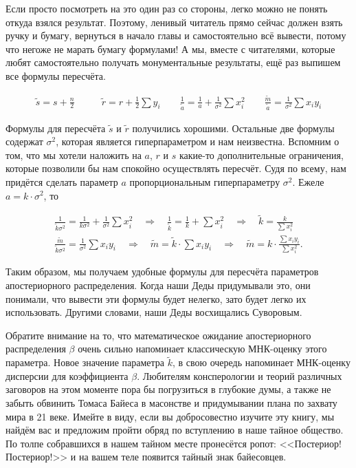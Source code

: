 \documentclass[12pt, a4paper, oneside]{extreport}
\def \b{\beta}
\theoremstyle{plain}              %
\theoremstyle{definition}         %
\begin{document}
Если просто посмотреть на это один раз со стороны, легко можно не понять откуда взялся результат. Поэтому, ленивый читатель прямо сейчас должен взять ручку и бумагу, вернуться в начало главы и самостоятельно всё вывести, потому что негоже не марать бумагу формулами! А мы, вместе с читателями, которые любят самостоятельно получать монументальные результаты, ещё раз выпишем все формулы пересчёта. 

\begin{align*}
\tilde s = s + \frac{n}{2}   \qquad&  \tilde r = r + \frac{1}{2} \sum y_i \qquad 
\frac{1}{\tilde a} = \frac{1}{a} + \frac{1}{\sigma^2} \sum x_i^2  \qquad  \frac{\tilde m}{\tilde a} = \frac{1}{\sigma^2} \sum x_i y_i 
\end{align*}

Формулы для пересчёта $\tilde s$ и $\tilde r$ получились хорошими. Остальные две формулы содержат $\sigma^2$, которая является гиперпараметром и нам неизвестна. Вспомним о том, что мы хотели наложить на $a$, $r$ и $s$ какие-то дополнительные ограничения, которые позволили бы нам спокойно осуществлять пересчёт. Судя по всему, нам придётся сделать параметр $a$ пропорциональным гиперпараметру $\sigma^2$. Ежеле $a = k \cdot \sigma^2$, то 

\begin{align*}
\frac{1}{\tilde k \sigma^2} = \frac{1}{k \sigma^2} + \frac{1}{\sigma^2} \sum x_i^2  \quad \Rightarrow \quad \frac{1}{\tilde k} = \frac{1}{k} + \sum x^2_i \quad \Rightarrow \quad \tilde k = \frac{k}{\sum x_i^2} \\
\frac{\tilde m}{\tilde k \sigma^2} = \frac{1}{\sigma^2} \sum x_i y_i \quad \Rightarrow \quad  \tilde m = \tilde k \cdot \sum x_i y_i \quad \Rightarrow \quad \tilde m = k \cdot \frac{\sum x_i y_i}{\sum x_i^2}.
\end{align*}

Таким образом, мы получаем удобные формулы для пересчёта параметров апостериорного распределения. Когда наши Деды придумывали это, они понимали, что вывести эти формулы будет нелегко, зато будет легко их использовать. Другими словами, наши Деды восхищались Суворовым. 

Обратите внимание на то, что математическое ожидание апостериорного распределения $\b$ очень сильно напоминает классическую МНК-оценку этого параметра. Новое значение параметра $\tilde k$,  в свою очередь напоминает МНК-оценку дисперсии для коэффициента $\beta$. Любителям консперологии и теорий различных заговоров на этом моменте пора бы погрузиться в глубокие думы, а также не забыть обвинить Томаса Байеса в масонстве и придумывании плана по захвату мира в 21 веке. Имейте в виду, если вы добросовестно изучите эту книгу, мы найдём вас и предложим пройти обряд по вступлению в наше тайное общество. По толпе собравшихся в нашем тайном месте пронесётся ропот: <<Постериор! Постериор!>> и на вашем теле появится тайный знак байесовцев. 
\end{document}
